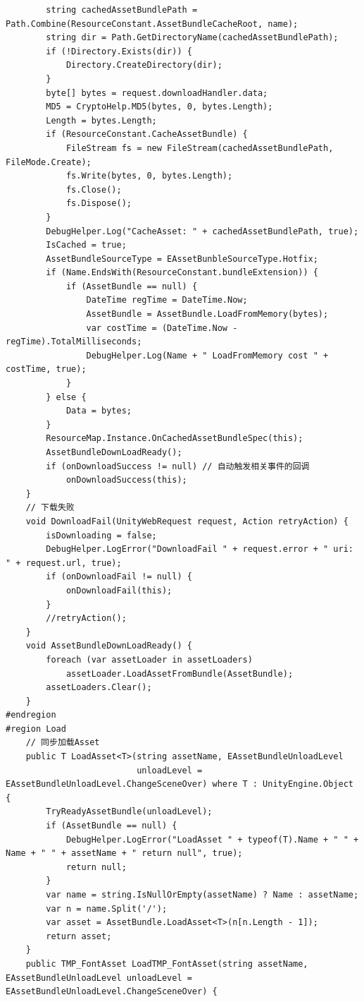 \documentclass[9pt, b5paper]{article}
\begin{document}
\begin{itemize}
\begin{verbatim}
        string cachedAssetBundlePath = Path.Combine(ResourceConstant.AssetBundleCacheRoot, name);
        string dir = Path.GetDirectoryName(cachedAssetBundlePath);
        if (!Directory.Exists(dir)) {
            Directory.CreateDirectory(dir);
        }
        byte[] bytes = request.downloadHandler.data;
        MD5 = CryptoHelp.MD5(bytes, 0, bytes.Length);
        Length = bytes.Length;
        if (ResourceConstant.CacheAssetBundle) {
            FileStream fs = new FileStream(cachedAssetBundlePath, FileMode.Create);
            fs.Write(bytes, 0, bytes.Length);
            fs.Close();
            fs.Dispose();
        }
        DebugHelper.Log("CacheAsset: " + cachedAssetBundlePath, true);
        IsCached = true;
        AssetBundleSourceType = EAssetBunbleSourceType.Hotfix;
        if (Name.EndsWith(ResourceConstant.bundleExtension)) {
            if (AssetBundle == null) {
                DateTime regTime = DateTime.Now;
                AssetBundle = AssetBundle.LoadFromMemory(bytes);
                var costTime = (DateTime.Now - regTime).TotalMilliseconds;
                DebugHelper.Log(Name + " LoadFromMemory cost " + costTime, true);
            }
        } else {
            Data = bytes;
        }
        ResourceMap.Instance.OnCachedAssetBundleSpec(this);
        AssetBundleDownLoadReady();
        if (onDownloadSuccess != null) // 自动触发相关事件的回调
            onDownloadSuccess(this);
    }
    // 下载失败
    void DownloadFail(UnityWebRequest request, Action retryAction) {
        isDownloading = false;
        DebugHelper.LogError("DownloadFail " + request.error + " uri: " + request.url, true);
        if (onDownloadFail != null) {
            onDownloadFail(this);
        }
        //retryAction();
    }
    void AssetBundleDownLoadReady() {
        foreach (var assetLoader in assetLoaders) 
            assetLoader.LoadAssetFromBundle(AssetBundle);
        assetLoaders.Clear();
    }
#endregion
#region Load
    // 同步加载Asset
    public T LoadAsset<T>(string assetName, EAssetBundleUnloadLevel
                          unloadLevel = EAssetBundleUnloadLevel.ChangeSceneOver) where T : UnityEngine.Object {
        TryReadyAssetBundle(unloadLevel);
        if (AssetBundle == null) {
            DebugHelper.LogError("LoadAsset " + typeof(T).Name + " " + Name + " " + assetName + " return null", true);
            return null;
        }
        var name = string.IsNullOrEmpty(assetName) ? Name : assetName;
        var n = name.Split('/');
        var asset = AssetBundle.LoadAsset<T>(n[n.Length - 1]);
        return asset;
    }
    public TMP_FontAsset LoadTMP_FontAsset(string assetName, EAssetBundleUnloadLevel unloadLevel = EAssetBundleUnloadLevel.ChangeSceneOver) {

\end{verbatim}
\end{itemize}
\end{document}
